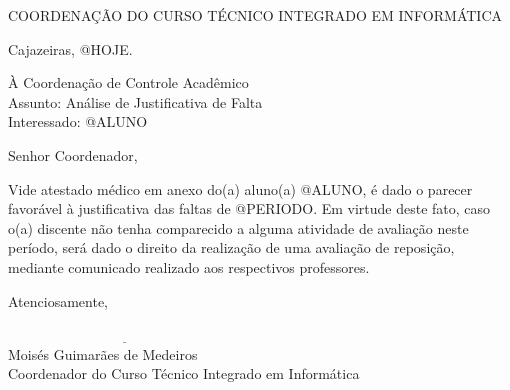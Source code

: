 \documentclass[a4paper, 12pt]{letter}
\begin{document}
{\bf
{\selectfont
    \begin{center}
        {\selectfont
            COORDENAÇÃO DO CURSO TÉCNICO INTEGRADO EM INFORMÁTICA
        }
    \end{center}
}

\begin{flushright}
Cajazeiras, @HOJE.
\end{flushright}

\noindent À Coordenação de Controle Acadêmico\\
Assunto: Análise de Justificativa de Falta\\
Interessado: @ALUNO

\noindent Senhor Coordenador,

\onehalfspacing Vide atestado médico em anexo do(a) aluno(a) @ALUNO, é dado o parecer favorável à justificativa das faltas de @PERIODO. Em virtude deste fato, caso o(a) discente não tenha comparecido a alguma atividade de avaliação neste período, será dado o direito da realização de uma avaliação de reposição, mediante comunicado realizado aos respectivos professores.

Atenciosamente,

\indent $\underline{\hspace{7cm}}$\\
\indent Moisés Guimarães de Medeiros\\
\indent Coordenador do Curso Técnico Integrado em Informática\\
}
\end{document}
